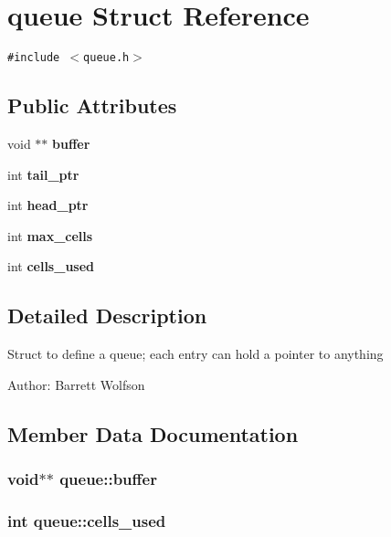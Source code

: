 \section{queue Struct Reference}
\label{structqueue}
{\tt \#include $<$queue.h$>$}

\subsection*{Public Attributes}
\begin{CompactItemize}
\item 
void $\ast$$\ast$ \bf{buffer}
\item 
int \bf{tail\_\-ptr}
\item 
int \bf{head\_\-ptr}
\item 
int \bf{max\_\-cells}
\item 
int \bf{cells\_\-used}
\end{CompactItemize}


\subsection{Detailed Description}
Struct to define a queue; each entry can hold a pointer to anything \begin{Desc}
\item[Author:]Barrett Wolfson \end{Desc}




\subsection{Member Data Documentation}
\subsubsection{\setlength{\rightskip}{0pt plus 5cm}void$\ast$$\ast$ \bf{queue::buffer}}\label{structqueue_1079a5aca3fd04c9e4b8b36148c35283}


\subsubsection{\setlength{\rightskip}{0pt plus 5cm}int \bf{queue::cells\_\-used}}\label{structqueue_e88e01c8225b1ccb49a8d0976e9f28ca}


